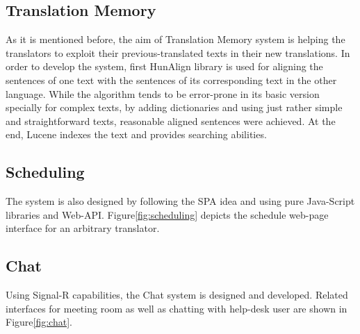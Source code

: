 \subsection{Translation Memory}
As it is mentioned before, the aim of Translation Memory system is helping the translators to exploit their previous-translated texts in their new translations. In order to develop the system, first HunAlign library is used for aligning the sentences of one text with the sentences of its corresponding text in the other language. While the algorithm tends to be error-prone in its basic version specially for complex texts, by adding dictionaries and using just rather simple and straightforward texts, reasonable aligned sentences were achieved. At the end, Lucene indexes the text and provides searching abilities.

\subsection{Scheduling}
The system is also designed by following the SPA idea and using pure Java-Script libraries and Web-API. Figure\ref{fig:scheduling} depicts the schedule web-page interface for an arbitrary translator.

\subsection{Chat}
Using Signal-R capabilities, the Chat system is designed and developed. Related interfaces for meeting room as well as chatting with help-desk user are shown in Figure\ref{fig:chat}.


